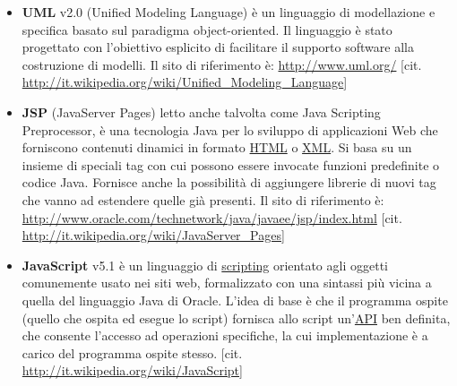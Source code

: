 \documentclass[a4paper,11pt]{article}
\begin{document}
\begin{itemize}
\item \textbf{UML} v2.0 (Unified Modeling Language) \`e un linguaggio di modellazione e specifica basato sul paradigma object-oriented. Il linguaggio \`e stato progettato con l'obiettivo esplicito di facilitare il supporto software alla costruzione di modelli. Il sito di riferimento \`e: \url{http://www.uml.org/} [cit. \url{http://it.wikipedia.org/wiki/Unified_Modeling_Language}]
\newpage
\item \textbf{JSP} (JavaServer Pages) letto anche talvolta come Java Scripting Preprocessor, \`e una tecnologia Java per lo sviluppo di applicazioni Web che forniscono contenuti dinamici in formato \underline{HTML} o \underline{XML}. Si basa su un insieme di speciali tag con cui possono essere invocate funzioni predefinite o codice Java. Fornisce anche la possibilit\`a di aggiungere librerie di nuovi tag che vanno ad estendere quelle gi\`a presenti. Il sito di riferimento \`e: \url{http://www.oracle.com/technetwork/java/javaee/jsp/index.html} [cit. \url{http://it.wikipedia.org/wiki/JavaServer_Pages}]
\item \textbf{JavaScript} v5.1 \`e un linguaggio di \underline{scripting} orientato agli oggetti comunemente usato nei siti web, formalizzato con una sintassi pi\`u vicina a quella del linguaggio Java di Oracle. L'idea di base \`e che il programma ospite (quello che ospita ed esegue lo script) fornisca allo script un'\underline{API} ben definita, che consente l'accesso ad operazioni specifiche, la cui implementazione \`e a carico del programma ospite stesso.
[cit. \url{http://it.wikipedia.org/wiki/JavaScript}]
\end{itemize}
\end{document}
